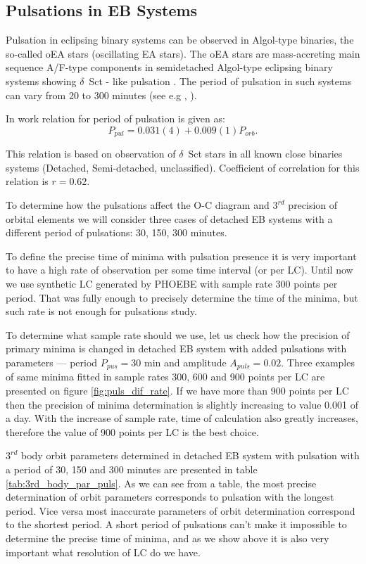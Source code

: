 \subsection{Pulsations in EB Systems}
Pulsation in eclipsing binary systems can be observed in Algol-type binaries, the so-called oEA stars (oscillating EA stars).
The oEA stars are mass-accreting main sequence A/F-type components in semidetached Algol-type eclipsing binary systems showing $\delta$~Sct - like pulsation \citep{Rodriguez2010}. The period of pulsation in such systems can vary from 20 to 300 minutes (see e.g \cite{Liakos2017}, \cite{Mkrtichian2007}). 

In work \cite{Liakos2017} relation for period of pulsation is given as:
\begin{equation}
P_{pul} = 0.031(4) + 0.009(1) P_{orb}. 
\end{equation} 

This relation is based on observation of $\delta$~Sct stars in all known close binaries systems (Detached, Semi-detached, unclassified). Coefficient of correlation for this relation is $r=0.62$.

To determine how the pulsations affect the O-C diagram and $3^{rd}$ precision of orbital elements we will consider three cases of detached EB systems with a different period of pulsations: 30, 150, 300 minutes.

To define the precise time of minima with pulsation presence it is very important to have a high rate of observation per some time interval (or per LC).
Until now we use synthetic LC generated by PHOEBE with sample rate 300 points per period. That was fully enough to precisely determine the time of the minima, but such rate is not enough for pulsations study.

To determine what sample rate should we use, let us check how the precision of primary minima is changed in detached EB system with added pulsations with parameters --- period $P_{pus}=30$ min and amplitude $A_{puls} = 0.02$. 
Three examples of same minima fitted in sample rates 300, 600 and 900 points per LC are presented on figure \ref{fig:puls_dif_rate}. If we have more than 900 points per LC then the precision of minima determination is slightly increasing to value 0.001 of a day. 
With the increase of sample rate, time of calculation also greatly increases, therefore the value of 900 points per LC is the best choice.

$3^{rd}$ body orbit parameters determined in detached EB system with pulsation with a period of 30, 150 and 300 minutes are presented in table \ref{tab:3rd_body_par_puls}. As we can see from a table, the most precise determination of orbit parameters corresponds to pulsation with the longest period. Vice versa most inaccurate parameters of orbit determination correspond to the shortest period. A short period of pulsations can't make it impossible to determine the precise time of minima, and as we show above it is also very important what resolution of LC do we have. 

